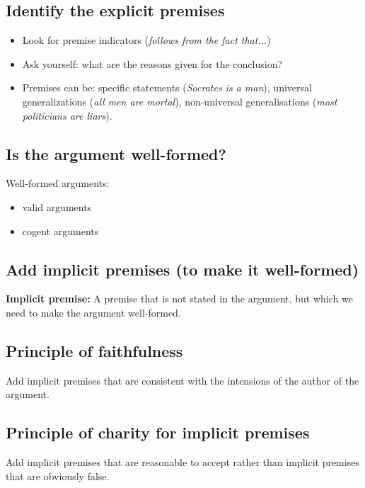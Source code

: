 \subsection{Identify the explicit premises}

\begin{itemize}
    \item Look for premise indicators (\textit{follows from the fact that...})
    \item Ask yourself: what are the reasons given for the conclusion?
    \item Premises can be: specific statements (\textit{Socrates is a man}),
        universal generalizations (\textit{all men are mortal}),
        non-universal generalisations (\textit{most politicians are liars}).
\end{itemize}

\subsection{Is the argument well-formed?}

Well-formed arguments:

\begin{itemize}
    \item valid arguments
    \item cogent arguments
\end{itemize}

\subsection{Add implicit premises (to make it well-formed)}

\textbf{Implicit premise:} A premise that is not stated in the argument, but
which we need to make the argument well-formed.

\subsection{Principle of faithfulness}

Add implicit premises that are consistent with the intensions of the author
of the argument.

\subsection{Principle of charity for implicit premises}

Add implicit premises that are reasonable to accept rather than implicit
premises that are obviously false.

